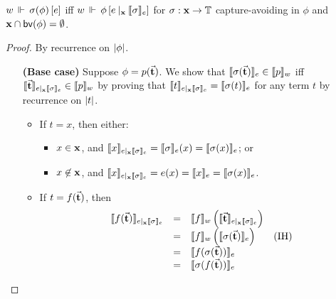 \begin{lemma}[Mirroring] 
  
  $w\,\Vdash\,\sigma(\phi)\,[e]$ iff
  $w\,\Vdash\,\phi\,[e \mathbin{|_{\mathbf{x}}} \llbracket \sigma \rrbracket_e]$ for $\sigma : \mathbf{x} \to
  \mathbb{T}$ capture-avoiding in $\phi$ and $\mathbf{x} \cap \mathsf{bv}(\phi) = \emptyset$.
\end{lemma}
\begin{proof}
  By recurrence on $\left|\phi\right|$.
  \begin{itemize}
    \item[\textbf{(Base case)}]
    \newcommand{\esigma}{\update{e}{\bx}{\interp{\sigma}_e}} Suppose
    $\phi = p(\vec{\mathbf{t}})$. We show that $\llbracket \sigma(\vec{\mathbf{t}}) \rrbracket_e \in
    \llbracket p \rrbracket_w$ iff $\interp{\tvec{t}}_{\esigma} \in \interp{p}_w$ by proving
    that $\interp{t}_{\esigma} = \interp{\sigma(t)}_e$ for any term $t$ by
    recurrence on $\left|t\right|$.
    \begin{itemize}
      \item If $t = x$, then either:
      \begin{itemize}
        \item $x \in \mathbf{x}$, and $\interp{x}_{\esigma} = \interp{\sigma}_e(x) = \interp{\sigma(x)}_e$; or
        \item $x \not\in \mathbf{x}$, and $\interp{x}_{\esigma} = e(x) = \interp{x}_e = \interp{\sigma(x)}_e$.
      \end{itemize}
      \item If $t = f(\vec{\mathbf{t}})$, then
        $$
        \begin{array}{rcll}
          \interp{f(\tvec{t})}_{\esigma}
          &=& \interp{f}_w\left(\interp{\tvec{t}}_{\esigma}\right) &\\
          &=& \interp{f}_w\left(\interp{\sigma(\tvec{t})}_e\right) &\text{(IH)}\\
          &=& \interp{f(\sigma(\tvec{t}))}_e &\\
          &=& \interp{\sigma(f(\tvec{t}))}_e &
        \end{array}
        $$
    \end{itemize}


\end{itemize}
\end{proof}

